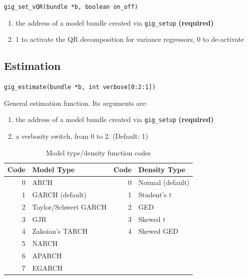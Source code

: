 \documentclass[a4paper,11pt]{article}
\newenvironment{funcdoc}[1]
{\noindent\hrulefill\newline\texttt{#1}\par\noindent\hrulefill\par\medskip\par}
{\bigskip}
\begin{document}
\begin{funcdoc}{gig\_set\_vQR(bundle *b, boolean on\_off)}
\begin{enumerate}
\item the address of a model bundle created via \texttt{gig\_setup}
  \textbf{(required)}
\item 1 to activate the QR decomposition for variance regressors, 0 to
  de-activate
\end{enumerate}
\end{funcdoc}

\subsection{Estimation}
\label{sec:syntax_estim}

\begin{funcdoc}{gig\_estimate(bundle *b, int verbose[0:2:1])}

General estimation function. %
Its arguments are:
\begin{enumerate}
\item the address of a model bundle created via \texttt{gig\_setup}
  \textbf{(required)}
\item a verbosity switch, from 0 to 2. (Default: 1)
\end{enumerate}
\end{funcdoc}

\begin{table}[htbp]
  \centering
  \begin{tabular}{rl|rl}
    \hline
    \textbf{Code} & \textbf{Model Type} & \textbf{Code} & \textbf{Density Type} \\
    \hline
    0 & ARCH & 0 & Normal (default) \\
    1 & GARCH (default) & 1 & Student's $t$ \\
    2 & Taylor/Schwert GARCH & 2 & GED\\
    3 & GJR & 3 & Skewed $t$ \\
    4 & Zakoian's TARCH & 4 & Skewed GED \\
    5 & NARCH \\
    6 & APARCH \\
    7 & EGARCH \\
    \hline
    \hline
  \end{tabular}
  \caption{Model type/density function codes}
  \label{tab:modelcodes}
\end{table}
\end{document}
